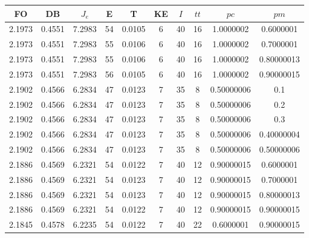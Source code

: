 \begin{table}[h!]
    \footnotesize
    \begin{center}
        \begin{tabular}{|c|c|c|c|c|c|c|c|c|c|}
        \hline
            {\bf FO} & {\bf DB} & $J_e$ & {\bf E} & {\bf T} & {\bf KE} & $I$ & $tt$ & $pc$ & $pm$ \\
        \hline
        \hline
            2.1973 & 0.4551  & 7.2983 & 54 & 0.0105 & 6 & 40 & 16 & 1.0000002 & 0.6000001\\
        \hline
        \hline
            2.1973 & 0.4551  & 7.2983 & 55 & 0.0106 & 6 & 40 & 16 & 1.0000002 & 0.7000001\\
        \hline
        \hline
            2.1973 & 0.4551  & 7.2983 & 55 & 0.0106 & 6 & 40 & 16 & 1.0000002 & 0.80000013\\
        \hline
        \hline
            2.1973 & 0.4551  & 7.2983 & 56 & 0.0105 & 6 & 40 & 16 & 1.0000002 & 0.90000015\\
        \hline
        \hline
            2.1902 & 0.4566  & 6.2834 & 47 & 0.0123 & 7 & 35 & 8 & 0.50000006 & 0.1\\
        \hline
        \hline
            2.1902 & 0.4566  & 6.2834 & 47 & 0.0123 & 7 & 35 & 8 & 0.50000006 & 0.2\\
        \hline
        \hline
            2.1902 & 0.4566  & 6.2834 & 47 & 0.0123 & 7 & 35 & 8 & 0.50000006 & 0.3\\
        \hline
        \hline
            2.1902 & 0.4566  & 6.2834 & 47 & 0.0123 & 7 & 35 & 8 & 0.50000006 & 0.40000004\\
        \hline
        \hline
            2.1902 & 0.4566  & 6.2834 & 47 & 0.0123 & 7 & 35 & 8 & 0.50000006 & 0.50000006\\
        \hline
        \hline
            2.1886 & 0.4569  & 6.2321 & 54 & 0.0122 & 7 & 40 & 12 & 0.90000015 & 0.6000001\\
        \hline
        \hline
            2.1886 & 0.4569  & 6.2321 & 54 & 0.0123 & 7 & 40 & 12 & 0.90000015 & 0.7000001\\
        \hline
        \hline
            2.1886 & 0.4569  & 6.2321 & 54 & 0.0123 & 7 & 40 & 12 & 0.90000015 & 0.80000013\\
        \hline
        \hline
            2.1886 & 0.4569  & 6.2321 & 54 & 0.0122 & 7 & 40 & 12 & 0.90000015 & 0.90000015\\
        \hline
        \hline
            2.1845 & 0.4578  & 6.2235 & 54 & 0.0122 & 7 & 40 & 22 & 0.6000001 & 0.90000015\\

\end{tabular}
\end{center}
\end{table}
